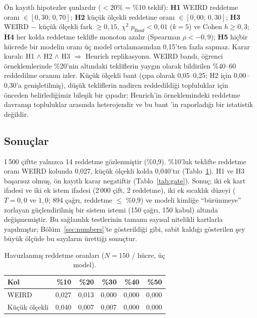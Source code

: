 \documentclass[11pt]{article}
\newcommand{\ltyirmi}{$<\!20\%$}
\begin{document}
Ön kayıtlı hipotezler şunlardır (\ltyirmi{} = \%10 teklif): \textbf{H1} WEIRD reddetme oranı $\in [0{,}30;\,0{,}70]$; \textbf{H2} küçük ölçekli reddetme oranı $\in [0{,}00;\,0{,}30]$; \textbf{H3} WEIRD $-$ küçük ölçekli fark $\geq 0{,}15$, $\chi^2$ $p_{\text{Bonf}} < 0{,}01$ ($k = 5$) ve Cohen $h \geq 0{,}3$; \textbf{H4} her kolda reddetme teklifle monoton azalır (Spearman $\rho < -0{,}9$); \textbf{H5} hiçbir hücrede bir modelin oranı üç model ortalamasından 0,15'ten fazla sapmaz. Karar kuralı: H1 $\wedge$ H2 $\wedge$ H3 $\Rightarrow$ Henrich replikasyonu. WEIRD bandı, öğrenci örneklemlerinde \%20'nin altındaki tekliflerin yaygın olarak bildirilen \%40--60 reddedilme oranını izler. Küçük ölçekli bant (çıpa olarak 0,05--0,25; H2 için 0,00--0,30'a genişletilmiş), düşük tekliflerin nadiren reddedildiği topluluklar için önceden belirlediğimiz bileşik bir çıpadır; Henrich'in örneklemindeki reddetme davranışı topluluklar arasında heterojendir ve bu bant \citet{henrich2001}'in raporladığı bir istatistik değildir.

\subsection{Sonuçlar}

1\,500 çiftte yalnızca 14 reddetme gözlenmiştir (\%0,9). \%10'luk teklifte reddetme oranı WEIRD kolunda 0,027, küçük ölçekli kolda 0,040'tır (Tablo~\ref{tab:rejection}). H1 ve H3 başarısız olmuş, ön kayıtlı karar negatiftir (Tablo~\ref{tab:gate}). Sonuç; iki ek kart ifadesi ve iki ek istem ifadesi (2\,000 çift, 2 reddetme), iki ek sıcaklık düzeyi ($T = 0{,}0$ ve $1{,}0$; 894 çağrı, reddetme $\leq$ \%0,9) ve modeli kimliğe ``bürünmeye'' zorlayan güçlendirilmiş bir sistem istemi (150 çağrı, 150 kabul) altında değişmemiştir. Bu sağlamlık testlerinin tamamı sayısal nitelikli kartlarla yapılmıştır; Bölüm~\ref{sec:numbers}'te gösterildiği gibi, sabit kaldığı gösterilen şey büyük ölçüde bu sayıların ürettiği sonuçtur.

\begin{table}[H]
\centering
\caption{Havuzlanmış reddetme oranları ($N = 150$ / hücre, üç model).}
\label{tab:rejection}
\begin{tabular}{lrrrrr}
\toprule
Kol & \%10 & \%20 & \%30 & \%40 & \%50 \\
\midrule
WEIRD           & 0,027 & 0,013 & 0,000 & 0,000 & 0,000 \\
Küçük ölçekli   & 0,040 & 0,007 & 0,007 & 0,000 & 0,000 \\
\bottomrule
\end{tabular}
\end{table}
\end{document}
